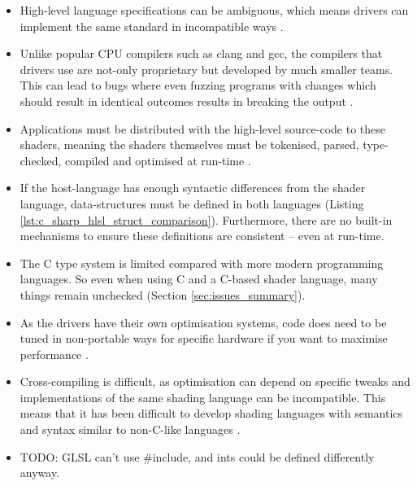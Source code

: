 \documentclass[a4paper,12pt,twoside,openright]{report}
\begin{document}
\begin{itemize}

    \item High-level language specifications can be ambiguous, which means
    drivers can implement the same standard in incompatible ways \cite{TODO}.

    \item Unlike popular CPU compilers such as clang and gcc, the compilers
    that drivers use are not-only proprietary but developed by much smaller
    teams. This can lead to bugs where even fuzzing programs with changes which
    should result in identical outcomes results in breaking the output
    \cite{GLFuzz}. %

    \item Applications must be distributed with the high-level source-code to
    these shaders, meaning the shaders themselves must be tokenised, parsed,
    type-checked, compiled and optimised at run-time \cite{TODO}.

    \item If the host-language has enough syntactic differences from the shader
    language, data-structures must be defined in both languages (Listing
    \ref{lst:c_sharp_hlsl_struct_comparison}). Furthermore, there are no
    built-in mechanisms to ensure these definitions are consistent -- even at
    run-time.

    \item The C type system is limited compared with more modern programming
    languages. So even when using C and a C-based shader language, many things
    remain unchecked (Section \ref{sec:issues_summary}).

    \item As the drivers have their own optimisation systems, code does need to
    be tuned in non-portable ways for specific hardware if you want to maximise
    performance \cite{TODO}.

    \item Cross-compiling is difficult, as optimisation can depend on specific
    tweaks and implementations of the same shading language can be
    incompatible. This means that it has been difficult to develop shading
    languages with semantics and syntax similar to non-C-like languages
    \cite{TODO}.

    \item TODO: GLSL can't use \#include, and ints could be defined differently
    anyway.

\end{itemize}
\end{document}
